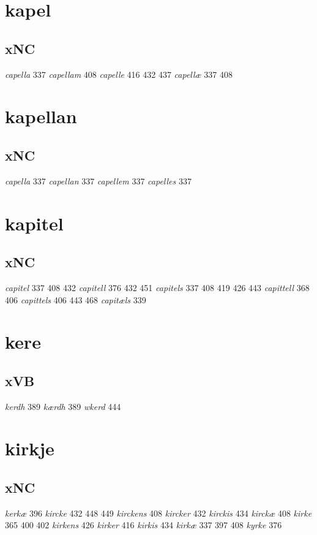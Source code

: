 \documentclass[a4paper,twocolumn]{article}
\begin{document}
\section{kapel}
\label{sec:orga7d08d0}
\subsection{xNC}
\label{sec:org70738f4}
\emph{capella} 337 \emph{capellam} 408 \emph{capelle} 416 432 437 \emph{capellæ} 337 408 
\section{kapellan}
\label{sec:org7f4c6bd}
\subsection{xNC}
\label{sec:orgf30e683}
\emph{capella} 337 \emph{capellan} 337 \emph{capellem} 337 \emph{capelles} 337 
\section{kapitel}
\label{sec:org2288b11}
\subsection{xNC}
\label{sec:org32d23cf}
\emph{capitel} 337 408 432 \emph{capitell} 376 432 451 \emph{capitels} 337 408 419 426 443 \emph{capittell} 368 406 \emph{capittels} 406 443 468 \emph{capitæls} 339 
\section{kere}
\label{sec:org6ce2889}
\subsection{xVB}
\label{sec:orgd60bbe3}
\emph{kerdh} 389 \emph{kærdh} 389 \emph{wkerd} 444 
\section{kirkje}
\label{sec:org9063f93}
\subsection{xNC}
\label{sec:org06e5a5a}
\emph{kerkæ} 396 \emph{kircke} 432 448 449 \emph{kirckens} 408 \emph{kircker} 432 \emph{kirckis} 434 \emph{kirckæ} 408 \emph{kirke} 365 400 402 \emph{kirkens} 426 \emph{kirker} 416 \emph{kirkis} 434 \emph{kirkæ} 337 397 408 \emph{kyrke} 376 
\end{document}
